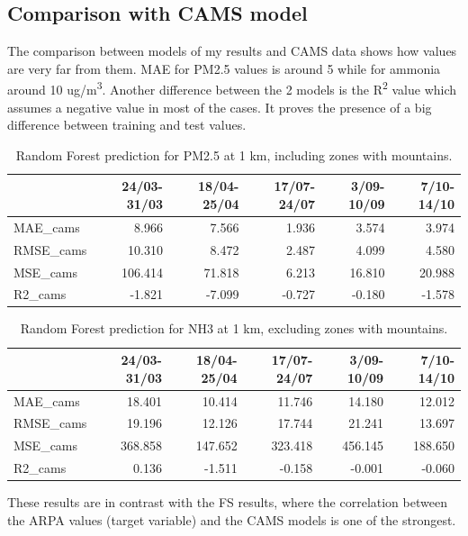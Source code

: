 \subsection{Comparison with CAMS model}
The comparison between models of my results and CAMS data shows how values are very far from them. MAE for PM2.5 values is around 5 while for ammonia around 10 ug/m\textsuperscript{3}. 
Another difference between the 2 models is the R\textsuperscript{2} value which assumes a negative value in most of the cases. It proves the presence of a big difference between training and test values. 


\begin{table}[H]
\begin{tabular}{lrrrrr}
\toprule
  &  24/03-31/03 &  18/04-25/04 &  17/07-24/07 &  3/09-10/09 &  7/10-14/10 \\
\midrule
   MAE\_cams &        8.966 &        7.566 &        1.936 &       3.574 &       3.974 \\
  RMSE\_cams &       10.310 &        8.472 &        2.487 &       4.099 &       4.580 \\
   MSE\_cams &      106.414 &       71.818 &        6.213 &      16.810 &      20.988 \\
    R2\_cams &       -1.821 &       -7.099 &       -0.727 &      -0.180 &      -1.578 \\
\bottomrule
\end{tabular}
\caption{Random Forest prediction for PM2.5 at 1 km, including zones with mountains.}
\end{table}
\begin{table}[H]
\begin{tabular}{lrrrrr}
\toprule
  &  24/03-31/03 &  18/04-25/04 &  17/07-24/07 &  3/09-10/09 &  7/10-14/10 \\
\midrule
   MAE\_cams &       18.401 &       10.414 &       11.746 &      14.180 &      12.012 \\
  RMSE\_cams &       19.196 &       12.126 &       17.744 &      21.241 &      13.697 \\
   MSE\_cams &      368.858 &      147.652 &      323.418 &     456.145 &     188.650 \\
    R2\_cams &        0.136 &       -1.511 &       -0.158 &      -0.001 &      -0.060 \\
\bottomrule
\end{tabular}
\caption{Random Forest prediction for NH3 at 1 km, excluding zones with mountains.}
\end{table}
These results are in contrast with the FS results, where the correlation between the ARPA values (target variable) and the CAMS models is one of the strongest.
